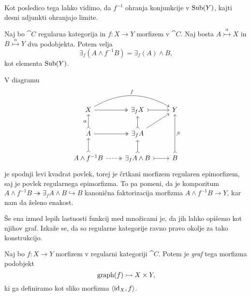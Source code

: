 \documentclass[../kategoricna_logika.tex]{subfiles}
\begin{document}
\noindent
Kot posledico tega lahko vidimo, da $f^{-1}$ ohranja konjunkcije v $\operatorname{Sub}(Y)$, kajti desni adjunkti ohranjajo limite.
\begin{lema}
  Naj bo $\cat{C}$ regularna kategorija in $f : X \to Y$ morfizem v $\cat{C}$.
  Naj bosta $A \overset{\alpha}{\rightarrowtail} X$ in $B \overset{\alpha}{\rightarrowtail} Y$ dva podobjekta.
  Potem velja
  $$\exists_f(A \wedge f^{-1}B) = \exists_f(A) \wedge B,$$
  kot elementa $\operatorname{Sub}(Y)$.
\end{lema}
\begin{dokaz}
  V diagramu
  \begin{equation*}
  \begin{tikzcd}
    X \ar[rr, bend left, "f"] \ar[r, two heads] & \exists_f X \ar[r, tail] & Y \\
    A \ar[u, tail, "\alpha"] \ar[r, two heads] & \exists_f A \ar[u, tail] \ar[ur] & \\
    A \land f^{-1}B \ar[u, tail] \ar[r, dashed, two heads] & \exists_f A \land B \ar[r, tail] \ar[u, tail] & B \ar[uu, tail, "\beta"']
  \end{tikzcd}
  \end{equation*}
  je spodnji levi kvadrat povlek, torej je črtkani morfizem regularen epimorfizem, saj je povlek regularnega epimorfizma.
  To pa pomeni, da je kompozitum 
  $A \land f^{-1}B \twoheadrightarrow \exists_f A \land B \hookrightarrow B$
  kanonična faktorizacija morfizma $A \land f^{-1}B \to Y$, kar nam da želeno enakost.
\end{dokaz}

Še ena izmed lepih lastnosti funkcij med množicami je, da jih lahko opišemo kot njihov graf.
Izkaže se, da so regularne kategorije ravno pravo okolje za tako konstrukcijo.
\begin{definicija}
  Naj bo $f : X \to Y$ morfizem v regularni kategoriji $\cat{C}$. Potem je \emph{graf} tega morfizma podobjekt
  $$\operatorname{graph}(f) \rightarrowtail X \times Y,$$
  ki ga definiramo kot sliko morfizma $\langle \mathrm{id}_X, f \rangle$.
\end{definicija}
\end{document}
